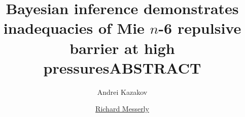 \documentclass[11pt,a4paper]{article}
\begin{document}
	\thispagestyle{empty}
	\title{\Large \textbf{Bayesian inference demonstrates inadequacies of Mie $n$-6 repulsive barrier at high pressures}} %
	\author[1]{\large {Andrei Kazakov}}
	\author[1]{\large {\underline{Richard Messerly}}}%
	
	
	
	\date{} %
	\maketitle\thispagestyle{empty} %
	\begin{center}
		\title{\textbf{ABSTRACT}}\centering{}
	\end{center}
	\justify
	
	
	
\end{document}

